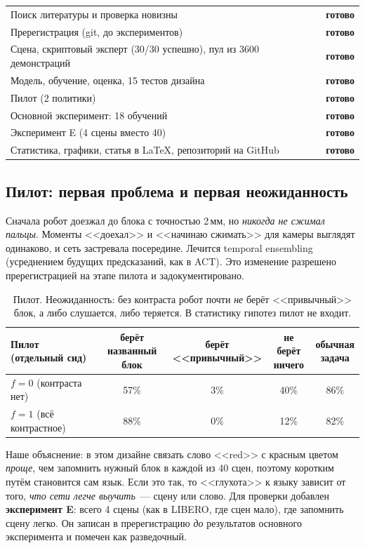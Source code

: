 \documentclass[11pt]{article}
\newcommand{\done}{\textcolor{green!50!black}{\textbf{готово}}}
\begin{document}
\begin{tabular}{ll}
Поиск литературы и проверка новизны & \done \\
Пререгистрация (git, до экспериментов) & \done \\
Сцена, скриптовый эксперт (30/30 успешно), пул из 3600 демонстраций & \done \\
Модель, обучение, оценка, 15 тестов дизайна & \done \\
Пилот (2 политики) & \done \\
Основной эксперимент: 18 обучений & \done \\
Эксперимент E (4 сцены вместо 40) & \done \\
Статистика, графики, статья в \LaTeX, репозиторий на GitHub & \done \\
\end{tabular}

\subsection*{Пилот: первая проблема и первая неожиданность}

Сначала робот доезжал до блока с точностью 2\,мм, но \emph{никогда не сжимал пальцы}. Моменты
<<доехал>> и <<начинаю сжимать>> для камеры выглядят одинаково, и сеть застревала посередине.
Лечится temporal ensembling (усреднением будущих предсказаний, как в ACT). Это изменение
разрешено пререгистрацией на этапе пилота и задокументировано.

\begin{table}[h]
\centering\small
\begin{tabular}{lcccc}
\toprule
Пилот (отдельный сид) & \makecell{берёт\\названный блок} & \makecell{берёт\\<<привычный>>} & \makecell{не берёт\\ничего} & \makecell{обычная\\задача} \\
\midrule
$f=0$ (контраста нет) & 57\% & 3\% & 40\% & 86\% \\
$f=1$ (всё контрастное) & 88\% & 0\% & 12\% & 82\% \\
\bottomrule
\end{tabular}
\caption{Пилот. Неожиданность: без контраста робот почти \emph{не} берёт <<привычный>> блок, а
либо слушается, либо теряется. В статистику гипотез пилот не входит.}
\end{table}

Наше объяснение: в этом дизайне связать слово <<red>> с красным цветом \emph{проще}, чем
запомнить нужный блок в каждой из 40 сцен, поэтому коротким путём становится сам язык.
Если это так, то <<глухота>> к языку зависит от того, \emph{что сети легче выучить}~--- сцену или
слово. Для проверки добавлен \textbf{эксперимент E}: всего 4 сцены (как в LIBERO, где сцен мало),
где запомнить сцену легко. Он записан в пререгистрацию \emph{до} результатов основного
эксперимента и помечен как разведочный.
\end{document}
